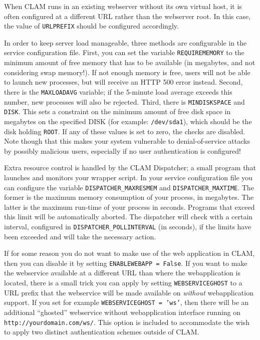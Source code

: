 \documentclass[a4paper,12pt,twoside,openright]{report}
\begin{document}
When CLAM runs in an existing webserver without its own virtual host, it is
often configured at a different URL rather than the webserver root. In this
case, the value of \texttt{URLPREFIX} should be configured accordingly.

In order to keep server load manageable, three methods are configurable in the
service configuration file. First, you can set the variable
\texttt{REQUIREMEMORY} to the minimum amount of free memory that has to be
available (in megabytes, and not considering swap memory!). If not enough
memory is free, users will not be able to launch new processes, but will
receive an HTTP 500 error instead. Second, there is the \texttt{MAXLOADAVG}
variable; if the 5-minute load average exceeds this number, new processes will
also be rejected. Third, there is \texttt{MINDISKSPACE} and \texttt{DISK}. This
sets a constraint on the minimum amount of free disk space in megabytes on the
specified DISK (for example: \texttt{/dev/sda1}), which should be the disk
holding \texttt{ROOT}. If any of these values is set to zero, the checks are
disabled. Note though that this makes your system vulnerable to
denial-of-service attacks by possibly malicious users, especially if no user
authentication is configured!

Extra resource control is handled by the CLAM Dispatcher; a small program that
launches and monitors your wrapper script. In your service configuration file
you can configure the variable \texttt{DISPATCHER\_MAXRESMEM} and
\texttt{DISPATCHER\_MAXTIME}. The former is the maximum memory consumption of
your process, in megabytes. The latter is the maximum run-time of your process
in seconds. Programs that exceed this limit will be automatically aborted. The
dispatcher will check with a certain interval, configured in
\texttt{DISPATCHER\_POLLINTERVAL} (in seconds), if the limits have been
exceeded and will take the necessary action.  
  

If for some reason you do not want to make use of the web application in CLAM,
then you can disable it by setting \texttt{ENABLEWEBAPP = False}. If you want
to make the webservice available at a different URL than where the
webapplication is located, there is a small trick you can apply by setting
\texttt{WEBSERVICEGHOST} to a URL prefix that the webservice will be made
available on \emph{without} webapplication support. If you set for example
\texttt{WEBSERVICEGHOST = 'ws'}, then there will be an additional ``ghosted''
webservice without webapplication interface running on
\texttt{http://yourdomain.com/ws/}. This option is included to accommodate the
wish to apply two distinct authentication schemes outside of CLAM. 
\end{document}
